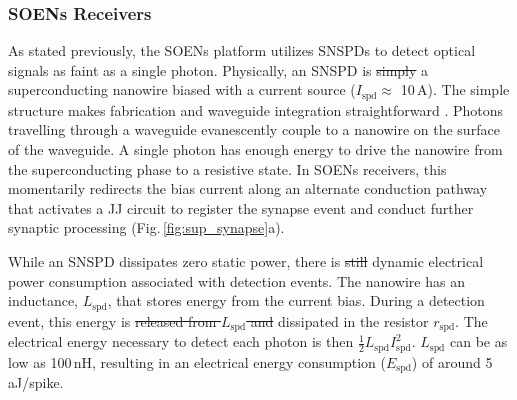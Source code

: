 \documentclass[twocolumn]{article}
\begin{document}
\subsubsection{SOENs Receivers}
As stated previously, the SOENs platform utilizes SNSPDs to detect optical signals as faint as a single photon. Physically, an SNSPD is \sout{simply} a superconducting nanowire biased with a current source ($I_{\mathrm{spd}} \approx$ 10\,\textmu A). The simple structure makes fabrication and waveguide integration straightforward \cite{spga2011,pesc2012,akhlaghi2015waveguide,feka2015,saga2015,shbu2017b,ferrari2018waveguide,buta2020}. Photons travelling through a waveguide evanescently couple to a nanowire on the surface of the waveguide. A single photon has enough energy to drive the nanowire from the superconducting phase to a resistive state. In SOENs receivers, this momentarily redirects the bias current along an alternate conduction pathway that activates a JJ circuit to register the synapse event and conduct further synaptic processing (Fig.\,\ref{fig:sup_synapse}a).

While an SNSPD dissipates zero static power, there is \sout{still} dynamic electrical power consumption associated with detection events. The nanowire has an inductance, $L_{\mathrm{spd}}$, that stores energy from the current bias. During a detection event, this energy is \sout{released from $L_{\mathrm{spd}}$ and} dissipated in the resistor $r_{\mathrm{spd}}$. The electrical energy necessary to detect each photon is then $\frac{1}{2}L_{\mathrm{spd}}I_{\mathrm{spd}}^2$. $L_{\mathrm{spd}}$ can be as low as 100\,nH, resulting in an electrical energy consumption ($E_{\mathrm{spd}}$) of around 5\,aJ/spike.
\end{document}
